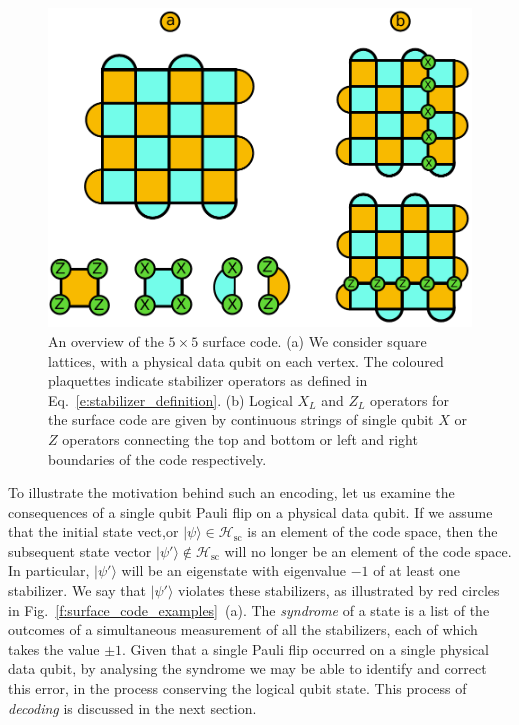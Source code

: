 \documentclass[twocolumn,preprintnumbers,amsmath,amssymb,notitlepage,nofootinbib,longbibliography,superscriptaddress,aps,pra,10pt]{revtex4-1}
\begin{document}
	\begin{figure}
		\centering
		\includegraphics[width=0.8\linewidth]{figures/surface_code.pdf}
		\caption{
			An overview of the $5 \times 5$ surface code.
			(a) We consider square lattices, with a physical data qubit on each vertex.
			The coloured plaquettes indicate stabilizer operators as defined in Eq.~\eqref{e:stabilizer_definition}.
			(b) Logical $X_L$ and $Z_L$ operators for the surface code are given by continuous strings of single qubit $X$ or $Z$ operators connecting the top and bottom or left and right boundaries of the code respectively.
		}
		\label{f:surface_code}
	\end{figure}

	To illustrate the motivation behind such an encoding, let us examine the consequences of a single qubit Pauli flip on a physical data qubit.
	If we assume that the initial state vect,or $|\psi\rangle \in \mathcal{H}_\mathrm{sc}$ is an element of the code space, then the subsequent state 
	vector $|\psi'\rangle \not \in \mathcal{H}_\mathrm{sc}$ will no longer be an element of the code space.
	In particular, $|\psi'\rangle$ will be an eigenstate with eigenvalue $-1$ of at least one stabilizer.
	We say that $|\psi'\rangle$ violates these stabilizers, as illustrated by red circles in Fig.~\ref{f:surface_code_examples}~(a).
	The \textit{syndrome} of a state is a list of the outcomes of a simultaneous measurement of all the stabilizers, each of which takes the value $\pm 1$.
	Given that a single Pauli flip occurred on a single physical data qubit, by analysing the syndrome we may be able to identify and correct this error, in the process conserving the logical qubit state.
	This process of \textit{decoding} is discussed in the next section.
\end{document}
